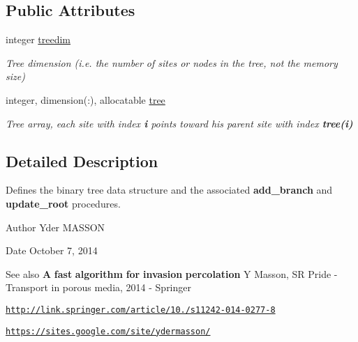 \subsection*{\-Public \-Attributes}
\begin{DoxyCompactItemize}
\item 
integer \hyperlink{classbinary__tree_a9fab803f212d6a162cc702c8bc36b60c}{treedim}
\begin{DoxyCompactList}\small\item\em \-Tree dimension (i.\-e. the number of sites or nodes in the tree, not the memory size) \end{DoxyCompactList}\item 
integer, dimension(\-:), allocatable \hyperlink{classbinary__tree_abdb595cef78ddee3138beca3b9913019}{tree}
\begin{DoxyCompactList}\small\item\em \-Tree array, each site with index {\bfseries i} points toward his parent site with index {\bfseries tree(i)} \end{DoxyCompactList}\end{DoxyCompactItemize}


\subsection{\-Detailed \-Description}
\-Defines the binary tree data structure and the associated {\bfseries add\-\_\-branch} and {\bfseries update\-\_\-root} procedures. 

\begin{DoxyAuthor}{\-Author}
\-Yder \-M\-A\-S\-S\-O\-N 
\end{DoxyAuthor}
\begin{DoxyDate}{\-Date}
\-October 7, 2014 
\end{DoxyDate}
\begin{DoxySeeAlso}{\-See also}
{\bfseries \-A} {\bfseries fast} {\bfseries algorithm} {\bfseries for} {\bfseries invasion} {\bfseries percolation} \-Y \-Masson, \-S\-R \-Pride -\/ \-Transport in porous media, 2014 -\/ \-Springer 

\href{http://link.springer.com/article/10.1007/s11242-014-0277-8}{\tt http\-://link.\-springer.\-com/article/10./s11242-\/014-\/0277-\/8} 

\href{https://sites.google.com/site/ydermasson/}{\tt https\-://sites.\-google.\-com/site/ydermasson/} 
\end{DoxySeeAlso}


